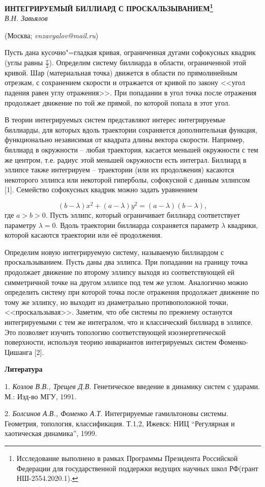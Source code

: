 
\begin{center}
    {\bf ИНТЕГРИРУЕМЫЙ БИЛЛИАРД С ПРОСКАЛЬЗЫВАНИЕМ\footnote{Исследование выполнено в рамках Программы Президента Российской Федерации для государственной поддержки ведущих научных школ РФ(грант НШ-2554.2020.1).}}\\

    {\it В.Н. Завьялов}

    (Москва; {\it vnzavyalov@mail.ru})
\end{center}


Пусть дана кусочно"=гладкая кривая, ограниченная дугами софокусных квадрик (углы равны $\frac{\pi}{2}$). Определим систему биллиарда в области, ограниченной этой кривой. Шар (материальная точка) движется в области по прямолинейным отрезкам, с сохранением скорости и отражается от кривой по закону <<угол падения равен углу отражения>>. При попадании в угол точка после отражения продолжает движение по той же прямой, по которой попала в этот угол.

В теории интегрируемых систем представляют интерес интегрируемые биллиарды, для которых вдоль траектории сохраняется дополнительная функция, функционально независимая от квадрата длины вектора скорости. Например, биллиард в окружности – любая траектория, касается меньшей окружности с тем же центром, т.е. радиус этой меньшей окружности есть интеграл. Биллиард в эллипсе также интегрируем – траектории (или их продолжения) касаются некоторого эллипса или некоторой гиперболы, софокусной с данным эллипсом [1].
Семейство софокусных квадрик можно задать уравнением

$$(b-\lambda)x^2+(a-\lambda)y^2=(a-\lambda)(b-\lambda),$$
где $a>b>0.$ Пусть эллипс, который ограничивает биллиард соответствует параметру $\lambda=0.$ Вдоль траектории биллиарда сохраняется параметр $\lambda$ квадрики, которой касаются траектории или её продолжения.

Определим новую интегрируемую систему, называемую биллиардом с проскальзыванием. Пусть даны два эллипса. При попадании на границу точка продолжает движение по второму эллипсу выходя из соответствующей ей симметричной точке на другом эллипсе под тем же углом. Аналогично можно определить систему при которой точка после отражения продолжает движение по тому же эллипсу, но выходит из диаметрально противоположной точки, <<проскальзывая>>. Заметим, что обе системы по прежнему останутся интегрируемыми с тем же интегралом, что и классический биллиард в эллипсе. Это позволяет изучить топологию соответствующей изоэнергетической поверхности, используя теорию инвариантов интегрируемых систем Фоменко-Цишанга [2].



\smallskip \centerline {\bf Литература} \nopagebreak

1. {\it Козлов В.В., Трещев Д.В.} Генетическое введение в динамику систем с ударами. М.: Изд-во МГУ, 1991.

2. {\it Болсинов А.В., Фоменко А.Т}. Интегрируемые гамильтоновы системы. Геометрия, топология, классификация. Т.1,2, Ижевск: НИЦ “Регулярная и хаотическая динамика”, 1999.
